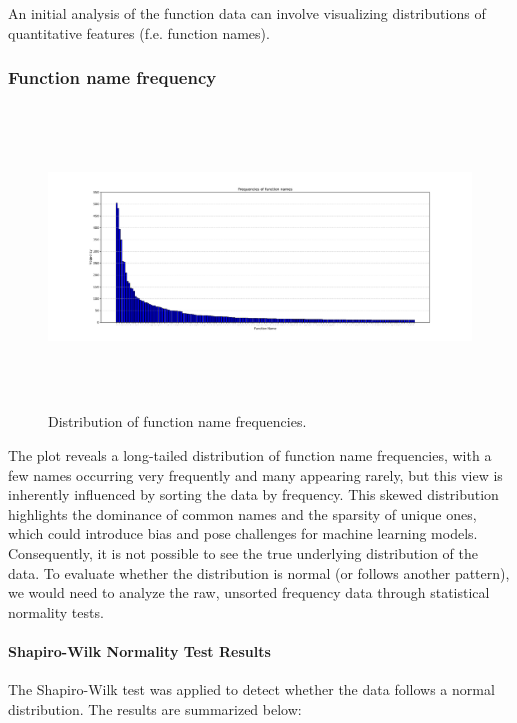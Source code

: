 \documentclass[10pt,english,a4paper]{report}
\begin{document}
An initial analysis of the function data can involve visualizing distributions of quantitative features (f.e. function names).

\subsubsection{Function name frequency}
\begin{figure}[H]
    \centering
    \includegraphics[width=16cm, height=8cm]{figures/names_merged.pdf}
    \caption{Distribution of function name frequencies.}
    \label{fig:func_freq_merged}
\end{figure}

The plot reveals a long-tailed distribution of function name frequencies, with a few names occurring very frequently and many appearing rarely, but this view is inherently influenced by sorting the data by frequency. This skewed distribution highlights the dominance of common names and the sparsity of unique ones, which could introduce bias and pose challenges for machine learning models. Consequently, it is not possible to see the true underlying distribution of the data. To evaluate whether the distribution is normal (or follows another pattern), we would need to analyze the raw, unsorted frequency data through statistical normality tests.

\paragraph{Shapiro-Wilk Normality Test Results}
The Shapiro-Wilk test was applied to detect whether the data follows a normal distribution. The results are summarized below:
\end{document}
